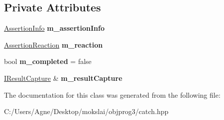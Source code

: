 \subsection*{Private Attributes}
\begin{DoxyCompactItemize}
\item 
\mbox{\label{class_catch_1_1_assertion_handler_ad171e8724bb771d97949b7270f400303}} 
\mbox{\hyperlink{struct_catch_1_1_assertion_info}{Assertion\+Info}} {\bfseries m\+\_\+assertion\+Info}
\item 
\mbox{\label{class_catch_1_1_assertion_handler_a8203c08a43a3761b5f400ee6587fad55}} 
\mbox{\hyperlink{struct_catch_1_1_assertion_reaction}{Assertion\+Reaction}} {\bfseries m\+\_\+reaction}
\item 
\mbox{\label{class_catch_1_1_assertion_handler_a5a756818dff781c155e8eb970d1d4c68}} 
bool {\bfseries m\+\_\+completed} = false
\item 
\mbox{\label{class_catch_1_1_assertion_handler_aea5283ee36124ce5c51dc2a697b22a39}} 
\mbox{\hyperlink{struct_catch_1_1_i_result_capture}{I\+Result\+Capture}} \& {\bfseries m\+\_\+result\+Capture}
\end{DoxyCompactItemize}


The documentation for this class was generated from the following file\+:\begin{DoxyCompactItemize}
\item 
C\+:/\+Users/\+Agne/\+Desktop/mokslai/objprog3/catch.\+hpp\end{DoxyCompactItemize}
